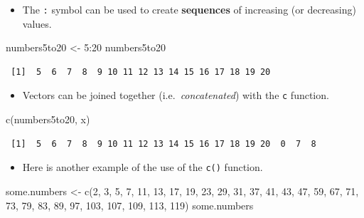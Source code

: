 \documentclass[
  9pt,
  a4paper,
  ignorenonframetext,
  notheorems]{beamer}
\newenvironment{Shaded}{\begin{snugshade}}{\end{snugshade}}
\newcommand{\DecValTok}[1]{\textcolor[rgb]{0.68,0.00,0.00}{#1}}
\newcommand{\FunctionTok}[1]{\textcolor[rgb]{0.28,0.35,0.67}{#1}}
\newcommand{\NormalTok}[1]{\textcolor[rgb]{0.00,0.23,0.31}{#1}}
\newcommand{\OtherTok}[1]{\textcolor[rgb]{0.00,0.23,0.31}{#1}}
\newcommand{\SpecialCharTok}[1]{\textcolor[rgb]{0.37,0.37,0.37}{#1}}
\providecommand{\tightlist}{%
  \setlength{\itemsep}{0pt}\setlength{\parskip}{0pt}}\usepackage{longtable,booktabs,array}
\begin{document}
\begin{frame}[fragile]
\begin{itemize}
\tightlist
\item
  The \texttt{:} symbol can be used to create \textbf{sequences} of
  increasing (or decreasing) values.
\end{itemize}

\begin{Shaded}
\begin{Highlighting}[]
\NormalTok{numbers5to20 }\OtherTok{\textless{}{-}} \DecValTok{5}\SpecialCharTok{:}\DecValTok{20}
\NormalTok{numbers5to20}
\end{Highlighting}
\end{Shaded}

\begin{verbatim}
 [1]  5  6  7  8  9 10 11 12 13 14 15 16 17 18 19 20
\end{verbatim}

\begin{itemize}
\tightlist
\item
  Vectors can be joined together (i.e.~\emph{concatenated}) with the
  \texttt{c} function.
\end{itemize}

\begin{Shaded}
\begin{Highlighting}[]
\FunctionTok{c}\NormalTok{(numbers5to20, x)}
\end{Highlighting}
\end{Shaded}

\begin{verbatim}
 [1]  5  6  7  8  9 10 11 12 13 14 15 16 17 18 19 20  0  7  8
\end{verbatim}

\begin{itemize}
\tightlist
\item
  Here is another example of the use of the \texttt{c()} function.
\end{itemize}

\begin{Shaded}
\begin{Highlighting}[]
\NormalTok{some.numbers }\OtherTok{\textless{}{-}} \FunctionTok{c}\NormalTok{(}\DecValTok{2}\NormalTok{, }\DecValTok{3}\NormalTok{, }\DecValTok{5}\NormalTok{, }\DecValTok{7}\NormalTok{, }\DecValTok{11}\NormalTok{, }\DecValTok{13}\NormalTok{, }\DecValTok{17}\NormalTok{, }\DecValTok{19}\NormalTok{, }\DecValTok{23}\NormalTok{, }\DecValTok{29}\NormalTok{, }\DecValTok{31}\NormalTok{, }\DecValTok{37}\NormalTok{, }\DecValTok{41}\NormalTok{,}
   \DecValTok{43}\NormalTok{, }\DecValTok{47}\NormalTok{, }\DecValTok{59}\NormalTok{, }\DecValTok{67}\NormalTok{, }\DecValTok{71}\NormalTok{, }\DecValTok{73}\NormalTok{, }\DecValTok{79}\NormalTok{, }\DecValTok{83}\NormalTok{, }\DecValTok{89}\NormalTok{, }\DecValTok{97}\NormalTok{, }\DecValTok{103}\NormalTok{, }\DecValTok{107}\NormalTok{, }\DecValTok{109}\NormalTok{, }\DecValTok{113}\NormalTok{, }\DecValTok{119}\NormalTok{)}
\NormalTok{some.numbers}
\end{Highlighting}
\end{Shaded}


\end{frame}
\end{document}
